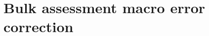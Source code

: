 \documentclass[11pt]{report}
\begin{document}




\chapter{Bulk assessment macro error correction}\label{sec:macro_error}
\end{document}
